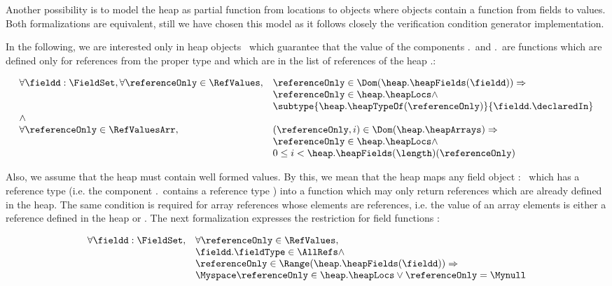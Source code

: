  Another possibility is to model the heap as partial function from locations to objects where objects contain a function from 
 fields to values. Both formalizations are equivalent, still we have chosen this model as it follows closely the
 verification condition generator   implementation.

 In the following, we are interested only in  heap objects \heap \ which guarantee that the value of the components
 \heap.\heapFields \ and \heap.\heapArrays \ are functions which are defined only for references from the proper
 type and which are in the list of references of the heap \heap.\heapLocs: 

 $$\begin{array}{ll}
          \forall  \fieldd : \FieldSet, \forall \referenceOnly \in \RefValues, &  \referenceOnly \in \Dom( \heap.\heapFields(\fieldd)) \Rightarrow \\
	  &  \referenceOnly  \in \heap.\heapLocs  \wedge \\
	  & \subtype{ \heap.\heapTypeOf(\referenceOnly ) }{\fieldd.\declaredIn} \\
	  \wedge &  \\
	  \forall \referenceOnly \in  \RefValuesArr, &  (\referenceOnly  , i ) \in \Dom (\heap.\heapArrays) \Rightarrow \\
	  &  \referenceOnly  \in  \heap.\heapLocs \wedge \\
	  & 0 \leq i < \heap.\heapFields( \length)( \referenceOnly)  
	 
   \end{array}
  $$

Also, we assume that the heap must contain well formed values. By this, we mean that the heap  maps any field object
 \fieldd : \FieldSet \ which has a reference  type (i.e. the component \fieldd.\fieldType \ contains a reference type  )  
into a function which may only return references which are already defined in the heap. The same condition is required for array references whose elements
are references, i.e. the value of an array elements is either a reference defined in the heap or \Mynull. The next formalization expresses the restriction for field 
functions : 

 $$\begin{array}{ll}
          \forall  \fieldd : \FieldSet, & \forall \referenceOnly \in \RefValues, \\ 
          & \fieldd.\fieldType \in \AllRefs  \wedge \\
	  & \referenceOnly  \in  \Range( \heap.\heapFields(\fieldd))  \Rightarrow \\
	  & \Myspace  \referenceOnly \in \heap.\heapLocs \vee \referenceOnly = \Mynull \\	  
   \end{array}
  $$
 

